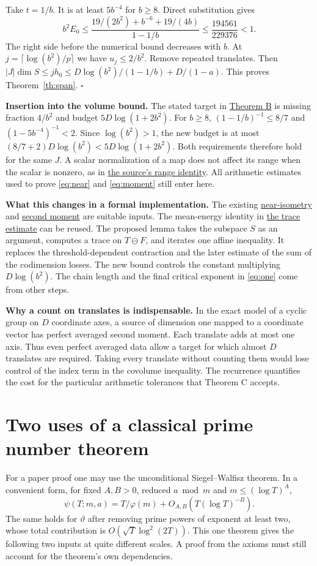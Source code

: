 \documentclass[11pt]{article}
\newcommand{\src}[3]{\href{https://github.com/VladimirReshetnikov/ProveIt/blob/d8415e76ad850651f8c0083afe689dd9f4a45a10/Analysis/GeneralizedRiemannHypothesis/vendor/grh-lean/grh/src/#1.lean\#L#2}{#3}}
\begin{document}
Take $t=1/b$. It is at least $5b^{-4}$ for $b\ge8$. Direct substitution gives
\[
 b^2 E_0\le\frac{19/(2b^2)+b^{-6}+19/(4b)}{1-1/b}
 \le\frac{194561}{229376}<1 .
\]
The right side before the numerical bound decreases with $b$. At $j=\lceil\log(b^2)/p\rceil$ we have $u_j\le 2/b^2$. Remove repeated translates. Then $|J|\dim S\le jh_0\le D\log(b^2)/(1-1/b)+D/(1-a)$. This proves Theorem~\ref{th:span}. \hfill$\square$

\textbf{Insertion into the volume bound.} The stated target in \src{New/Reduction/ShortAndEnough}{448}{Theorem B} is missing fraction $4/b^2$ and budget $5D\log(1+2b^2)$. For $b\ge8$, $(1-1/b)^{-1}\le8/7$ and $(1-5b^{-4})^{-1}<2$. Since $\log(b^2)>1$, the new budget is at most $(8/7+2)D\log(b^2)<5D\log(1+2b^2)$. Both requirements therefore hold for the same $J$. A scalar normalization of a map does not affect its range when the scalar is nonzero, as in \src{New/Reduction/ShortAndEnough}{386}{the source's range identity}. All arithmetic estimates used to prove \eqref{eq:near} and \eqref{eq:moment} still enter here.

\textbf{What this changes in a formal implementation.} The existing \src{New/Spanning/SecondMoment/SpanningTheorem}{257}{near-isometry} and \src{New/Spanning/SecondMoment/SpanningTheorem}{288}{second moment} are suitable inputs. The mean-energy identity in \src{New/Spanning/SecondMoment/FewTranslates}{288}{the trace estimate} can be reused. The proposed lemma takes the subspace $S$ as an argument, computes a trace on $T\ominus F$, and iterates one affine inequality. It replaces the threshold-dependent contraction and the later estimate of the sum of the codimension losses. The new bound controls the constant multiplying $D\log(b^2)$. The chain length and the final critical exponent in \eqref{eq:one} come from other steps.

\textbf{Why a count on translates is indispensable.} In the exact model of a cyclic group on $D$ coordinate axes, a source of dimension one mapped to a coordinate vector has perfect averaged second moment. Each translate adds at most one axis. Thus even perfect averaged data allow a target for which almost $D$ translates are required. Taking every translate without counting them would lose control of the index term in the covolume inequality. The recurrence quantifies the cost for the particular arithmetic tolerances that Theorem C accepts.

\newpage
\section{Two uses of a classical prime number theorem}\label{sec:classical}
For a paper proof one may use the unconditional Siegel--Walfisz theorem. In a convenient form, for fixed $A,B>0$, reduced $a\bmod m$ and $m\le(\log T)^A$,
\[
 \psi(T;m,a)=T/\varphi(m)+O_{A,B}(T(\log T)^{-B}).
\]
The same holds for $\vartheta$ after removing prime powers of exponent at least two, whose total contribution is $O(\sqrt T\log^2(2T))$. This one theorem gives the following two inputs at quite different scales. A proof from the axioms must still account for the theorem's own dependencies.
\end{document}
